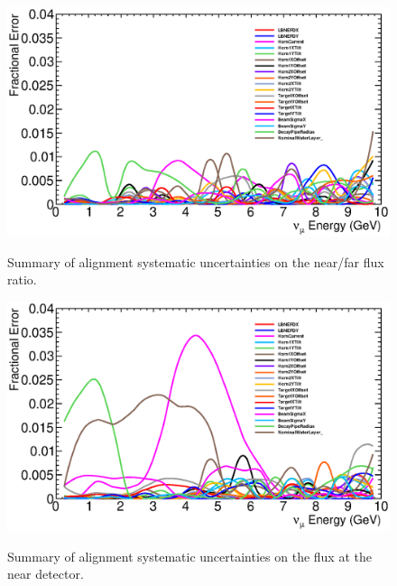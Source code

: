 {\begin{figure}[ht]
  \begin{center}
    {\includegraphics[width=6.0in]{figures/error_summary_nof.eps}}
  \end{center}
\caption{ Summary of alignment systematic uncertainties on the near/far flux ratio.}
\end{figure}

\begin{figure}[ht]
  \begin{center}
    {\includegraphics[width=6.0in]{figures/error_summary_near.eps}}
  \end{center}
\caption{ Summary of alignment systematic uncertainties on the flux at the near detector.}
\end{figure}

}
